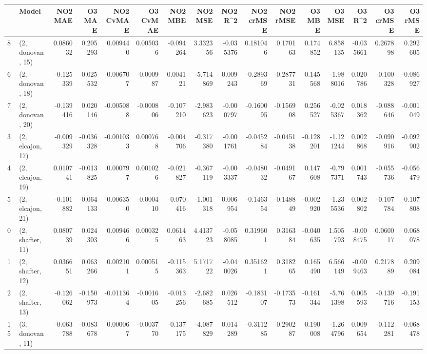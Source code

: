 \begin{tabular}{llrrrrrrrrrrrrrr}
\toprule
{} &             Model &   NO2 MAE &    O3 MAE &  NO2 CvMAE &  O3 CvMAE &   NO2 MBE &    NO2 MSE &   NO2 R\textasciicircum2 &  NO2 crMSE &  NO2 rMSE &    O3 MBE &     O3 MSE &    O3 R\textasciicircum2 &  O3 crMSE &   O3 rMSE \\
\midrule
8  &  (2, donovan, 15) &  0.086032 &  0.205293 &   0.009440 &  0.005036 & -0.094264 &   3.332356 & -0.035376 &   0.181046 &  0.170163 &  0.174852 &   6.858135 & -0.035661 &  0.267898 &  0.292605 \\
6  &  (2, donovan, 18) & -0.125339 & -0.025532 &  -0.006707 & -0.000987 &  0.004121 &  -5.714869 &  0.009243 &  -0.289369 & -0.287731 &  0.145568 &  -1.988016 &  0.020786 & -0.100328 & -0.086927 \\
7  &  (2, donovan, 20) & -0.139416 &  0.020146 &  -0.005088 & -0.000806 & -0.107210 &  -2.983623 & -0.000797 &  -0.160095 & -0.156908 &  0.256527 &  -0.025367 &  0.018362 & -0.088646 & -0.001049 \\
3  &  (2, elcajon, 17) & -0.009329 & -0.036328 &  -0.001033 &  0.000768 & -0.004706 &  -0.317380 & -0.001761 &  -0.045284 & -0.045138 & -0.128201 &  -1.121244 &  0.002868 & -0.090916 & -0.092902 \\
4  &  (2, elcajon, 19) &  0.010741 & -0.013825 &   0.000797 &  0.001026 & -0.021827 &  -0.367119 & -0.003337 &  -0.048032 & -0.049167 &  0.147608 &  -0.797371 &  0.001743 & -0.055736 & -0.056479 \\
5  &  (2, elcajon, 21) & -0.101882 & -0.064133 &  -0.006350 & -0.000410 & -0.070416 &  -1.001318 &  0.006954 &  -0.146354 & -0.148849 & -0.002920 &  -1.235536 &  0.002802 & -0.107784 & -0.107808 \\
0  &  (2, shafter, 11) &  0.080739 &  0.024303 &   0.009466 &  0.000325 &  0.061463 &   4.413723 & -0.058085 &   0.319601 &  0.316384 & -0.040635 &   1.505793 & -0.008475 &  0.060017 &  0.068078 \\
1  &  (2, shafter, 12) &  0.036651 &  0.063266 &   0.002101 &  0.000515 & -0.115363 &   5.171722 & -0.040026 &   0.351621 &  0.318265 &  0.165490 &   6.566149 & -0.009463 &  0.217889 &  0.209084 \\
2  &  (2, shafter, 13) & -0.126062 & -0.150973 &  -0.011364 & -0.001605 & -0.013256 &  -2.682685 &  0.026512 &  -0.183107 & -0.173573 & -0.161344 &  -5.761398 &  0.005593 & -0.139716 & -0.191153 \\
15 &  (3, donovan, 11) & -0.063788 & -0.083678 &   0.000067 & -0.003770 & -0.137175 &  -4.087829 &  0.014289 &  -0.311285 & -0.290287 &  0.190008 &  -1.264796 &  0.009654 & -0.112281 & -0.068478 \\

\end{tabular}
